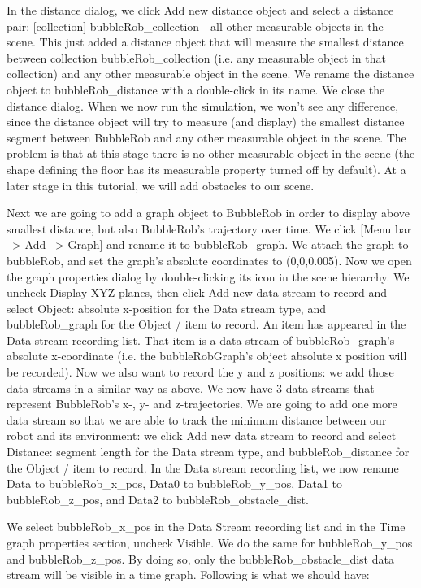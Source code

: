
In the distance dialog, we click Add new distance object and select a 
distance pair: [collection] bubbleRob\_collection - all other measurable 
objects in the scene. This just added a distance object that will measure 
the smallest distance between collection bubbleRob\_collection (i.e. any 
measurable object in that collection) and any other measurable object in 
the scene. We rename the distance object to bubbleRob\_distance with a 
double-click in its name. We close the distance dialog. When we now run 
the simulation, we won't see any difference, since the distance object 
will try to measure (and display) the smallest distance segment between 
BubbleRob and any other measurable object in the scene. The problem is 
that at this stage there is no other measurable object in the scene (the
shape defining the floor has its measurable property turned off by 
default). At a later stage in this tutorial, we will add obstacles
to our scene.

Next we are going to add a graph object to BubbleRob in order to display 
above smallest distance, but also BubbleRob's trajectory over time. We 
click [Menu bar --> Add --> Graph] and rename it to bubbleRob\_graph. We 
attach the graph to bubbleRob, and set the graph's absolute coordinates 
to (0,0,0.005). Now we open the graph properties dialog by double-clicking 
its icon in the scene hierarchy. We uncheck Display XYZ-planes, then click
Add new data stream to record and select Object: absolute x-position for 
the Data stream type, and bubbleRob\_graph for the Object / item to record. 
An item has appeared in the Data stream recording list. That item is a
data stream of bubbleRob\_graph's absolute x-coordinate (i.e. the
bubbleRobGraph's object absolute x position will be recorded). Now we also
want to record the y and z positions: we add those data streams in a similar
way as above. We now have 3 data streams that represent BubbleRob's x-, y-
and z-trajectories. We are going to add one more data stream so that we are
able to track the minimum distance between our robot and its environment: 
we click Add new data stream to record and select Distance: segment length 
for the Data stream type, and bubbleRob\_distance for the Object / item to 
record. In the Data stream recording list, we now rename Data to 
bubbleRob\_x\_pos, Data0 to bubbleRob\_y\_pos, Data1 to bubbleRob\_z\_pos, and 
Data2 to bubbleRob\_obstacle\_dist.

We select bubbleRob\_x\_pos in the Data Stream recording list and in the Time 
graph properties section, uncheck Visible. We do the same for 
bubbleRob\_y\_pos and bubbleRob\_z\_pos. By doing so, only the
bubbleRob\_obstacle\_dist data stream will be visible in a time graph.
Following is what we should have:

